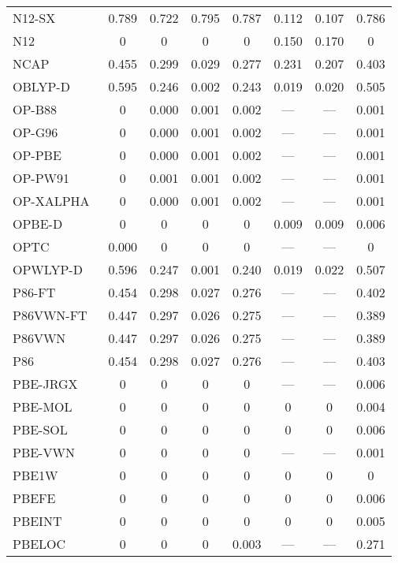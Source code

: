 \begin{table*}
\begin{tabular}{|l|c|c|c|c|c|c|c|}
N12-SX~\cite{Peverati2012_16187} & 0.789 & 0.722 & 0.795 & 0.787 & 0.112 & 0.107 & 0.786 \\
N12~\cite{Peverati2012_2310} & 0 & 0 & 0 & 0 & 0.150 & 0.170 & 0 \\
NCAP~\cite{Carmona2019_303} & 0.455 & 0.299 & 0.029 & 0.277 & 0.231 & 0.207 & 0.403 \\
OBLYP-D~\cite{Goerigk2010_107} & 0.595 & 0.246 & 0.002 & 0.243 & 0.019 & 0.020 & 0.505 \\
OP-B88~\cite{Tsuneda1999_10664} & 0 & 0.000 & 0.001 & 0.002 & --- & --- & 0.001 \\
OP-G96~\cite{Tsuneda1999_10664,Tsuneda1999_5656} & 0 & 0.000 & 0.001 & 0.002 & --- & --- & 0.001 \\
OP-PBE~\cite{Tsuneda1999_10664,Tsuneda1999_5656} & 0 & 0.000 & 0.001 & 0.002 & --- & --- & 0.001 \\
OP-PW91~\cite{Tsuneda1999_10664,Tsuneda1999_5656} & 0 & 0.001 & 0.001 & 0.002 & --- & --- & 0.001 \\
OP-XALPHA~\cite{Tsuneda1999_10664,Tsuneda1999_5656} & 0 & 0.000 & 0.001 & 0.002 & --- & --- & 0.001 \\
OPBE-D~\cite{Goerigk2010_107} & 0 & 0 & 0 & 0 & 0.009 & 0.009 & 0.006 \\
OPTC~\cite{Cohen2001_607} & 0.000 & 0 & 0 & 0 & --- & --- & 0 \\
OPWLYP-D~\cite{Goerigk2010_107} & 0.596 & 0.247 & 0.001 & 0.240 & 0.019 & 0.022 & 0.507 \\
P86-FT~\cite{Perdew1986_8822} & 0.454 & 0.298 & 0.027 & 0.276 & --- & --- & 0.402 \\
P86VWN-FT~\cite{Perdew1986_8822} & 0.447 & 0.297 & 0.026 & 0.275 & --- & --- & 0.389 \\
P86VWN~\cite{Perdew1986_8822} & 0.447 & 0.297 & 0.026 & 0.275 & --- & --- & 0.389 \\
P86~\cite{Perdew1986_8822} & 0.454 & 0.298 & 0.027 & 0.276 & --- & --- & 0.403 \\
PBE-JRGX~\cite{Pedroza2009_201106} & 0 & 0 & 0 & 0 & --- & --- & 0.006 \\
PBE-MOL~\cite{delCampo2012_104108} & 0 & 0 & 0 & 0 & 0 & 0 & 0.004 \\
PBE-SOL~\cite{Perdew2008_136406} & 0 & 0 & 0 & 0 & 0 & 0 & 0.006 \\
PBE-VWN~\cite{Kraisler2010_042516,Perdew1996_3865,Perdew1996_3865_err} & 0 & 0 & 0 & 0 & --- & --- & 0.001 \\
PBE1W~\cite{Dahlke2005_15677} & 0 & 0 & 0 & 0 & 0 & 0 & 0 \\
PBEFE~\cite{Perez2015_3844} & 0 & 0 & 0 & 0 & 0 & 0 & 0.006 \\
PBEINT~\cite{Fabiano2010_113104} & 0 & 0 & 0 & 0 & 0 & 0 & 0.005 \\
PBELOC~\cite{Constantin2012_035130} & 0 & 0 & 0 & 0.003 & --- & --- & 0.271 \\
\bottomrule
\end{tabular}
\end{table*}
